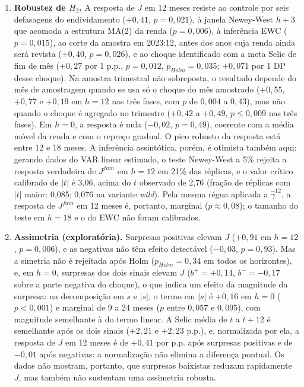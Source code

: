 \documentclass[12pt,a4paper]{article}
\begin{document}
\begin{enumerate}
    \item \textbf{Robustez de $H_2$.} A resposta de $J$ em 12 meses resiste ao controle por seis defasagens do endividamento ($+0{,}41$, $p = 0{,}021$), à janela Newey-West $h + 3$ que acomoda a estrutura MA(2) da renda ($p = 0{,}006$), à inferência EWC ($p = 0{,}015$), ao corte da amostra em 2023:12, antes dos anos cuja renda ainda será revista ($+0{,}40$, $p = 0{,}026$), e ao choque identificado com a meta Selic de fim de mês ($+0{,}27$ por 1 p.p., $p = 0{,}012$, $p_{Holm} = 0{,}035$; $+0{,}071$ por 1 DP desse choque). Na amostra trimestral não sobreposta, o resultado depende do mês de amostragem quando se usa só o choque do mês amostrado ($+0{,}55$, $+0{,}77$ e $+0{,}19$ em $h = 12$ nas três fases, com $p$ de $0{,}004$ a $0{,}43$), mas não quando o choque é agregado no trimestre ($+0{,}42$ a $+0{,}49$, $p \le 0{,}009$ nas três fases). Em $h = 0$, a resposta é nula ($-0{,}02$, $p = 0{,}49$), coerente com a média móvel da renda e com o repreço gradual. O pico robusto da resposta está entre 12 e 18 meses. A inferência assintótica, porém, é otimista também aqui: gerando dados do VAR linear estimado, o teste Newey-West a 5\% rejeita a resposta verdadeira de $J^{fam}$ em $h = 12$ em 21\% das réplicas, e o valor crítico calibrado de $|t|$ é 3,06, acima do $t$ observado de 2,76 (fração de réplicas com $|t|$ maior: 0,085; 0,076 na variante \textit{wild}). Pela mesma régua aplicada a $\hat{\gamma}^{12}$, a resposta de $J^{fam}$ em 12 meses é, portanto, marginal ($p \approx 0{,}08$); o tamanho do teste em $h = 18$ e o do EWC não foram calibrados.
    \item \textbf{Assimetria (exploratória).} Surpresas positivas elevam $J$ ($+0{,}91$ em $h = 12$, $p = 0{,}006$), e as negativas não têm efeito detectável ($-0{,}03$, $p = 0{,}93$). Mas a simetria não é rejeitada após Holm ($p_{Holm} = 0{,}34$ em todos os horizontes), e, em $h = 0$, surpresas dos dois sinais elevam $J$ ($b^+ = +0{,}14$, $b^- = -0{,}17$ sobre a parte negativa do choque), o que indica um efeito da magnitude da surpresa: na decomposição em $s$ e $|s|$, o termo em $|s|$ é $+0{,}16$ em $h = 0$ ($p < 0{,}001$) e marginal de 9 a 24 meses ($p$ entre $0{,}057$ e $0{,}095$), com magnitude semelhante à do termo linear. A Selic média de $t$ a $t + 12$ é semelhante após os dois sinais ($+2{,}21$ e $+2{,}23$ p.p.), e, normalizada por ela, a resposta de $J$ em 12 meses é de $+0{,}41$ por p.p. após surpresas positivas e de $-0{,}01$ após negativas: a normalização não elimina a diferença pontual. Os dados não mostram, portanto, que surpresas baixistas reduzam rapidamente $J$, mas também não sustentam uma assimetria robusta.
\end{enumerate}
\end{document}
